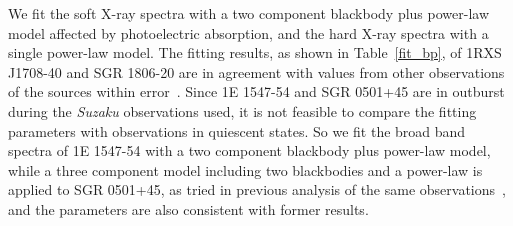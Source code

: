 \documentclass[]{raa}
\begin{document}
We fit the soft X-ray spectra with a two component blackbody plus power-law model affected by photoelectric absorption, and the hard X-ray spectra with a single power-law model.
%
The fitting results, as shown in Table~\ref{fit_bp}, of 1RXS J1708-40 and SGR 1806-20 are in agreement with values from other observations of the sources within error~\citep{Rea07, Esposito07,Enoto10}. 
%
Since 1E 1547-54 and SGR 0501+45 are in outburst during the {\it Suzaku} observations used, it is not feasible to compare the fitting parameters with observations in quiescent states.
%
So we fit the broad band spectra of 1E 1547-54 with a two component blackbody plus power-law model, while a three component model including two blackbodies and a power-law is applied to SGR 0501+45, as tried in previous analysis of the same observations~\citep{suzaku_1547,suzaku_0501}, and the parameters are also consistent with former results.
%
\end{document}
